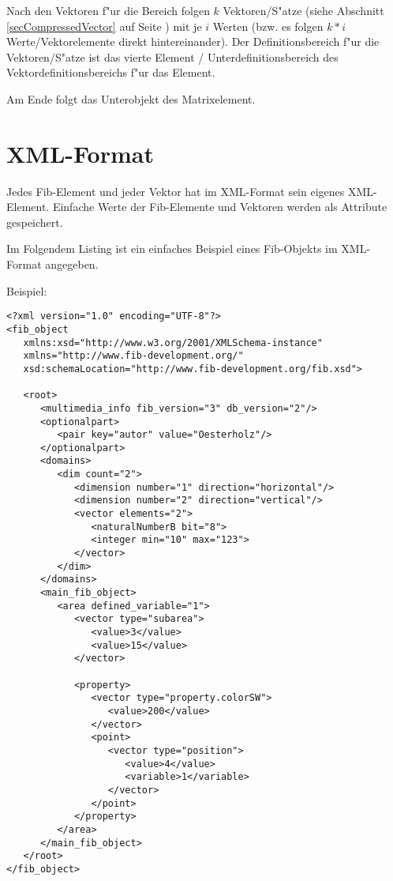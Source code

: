 Nach den Vektoren f"ur die Bereich folgen $k$ Vektoren/S"atze (siehe Abschnitt \ref{secCompressedVector} auf Seite \pageref{secCompressedVector}) mit je $i$ Werten (bzw. es folgen $k * i$ Werte/Vektorelemente direkt hintereinander). Der Definitionsbereich f"ur die Vektoren/S"atze ist das vierte Element / Unterdefinitionsbereich des Vektordefinitionsbereichs f"ur das Element.

Am Ende folgt das Unterobjekt des Matrixelement.






\section{XML-Format}
\label{xmlFormat}

Jedes Fib-Element und jeder Vektor hat im XML-Format sein eigenes XML-Element. Einfache Werte der Fib-Elemente und Vektoren werden als Attribute gespeichert.

Im Folgendem Listing ist ein einfaches Beispiel eines Fib-Objekts im XML-Format angegeben.

\bigskip\noindent
Beispiel:
\begin{verbatim}
<?xml version="1.0" encoding="UTF-8"?>
<fib_object
   xmlns:xsd="http://www.w3.org/2001/XMLSchema-instance"
   xmlns="http://www.fib-development.org/"
   xsd:schemaLocation="http://www.fib-development.org/fib.xsd">

   <root>
      <multimedia_info fib_version="3" db_version="2"/>
      <optionalpart>
         <pair key="autor" value="Oesterholz"/>
      </optionalpart>
      <domains>
         <dim count="2">
            <dimension number="1" direction="horizontal"/>
            <dimension number="2" direction="vertical"/>
            <vector elements="2">
               <naturalNumberB bit="8">
               <integer min="10" max="123">
            </vector>
         </dim>
      </domains>
      <main_fib_object>
         <area defined_variable="1">
            <vector type="subarea">
               <value>3</value>
               <value>15</value>
            </vector>

            <property>
               <vector type="property.colorSW">
                  <value>200</value>
               </vector>
               <point>
                  <vector type="position">
                     <value>4</value>
                     <variable>1</variable>
                  </vector>
               </point>
            </property>
         </area>
      </main_fib_object>
   </root>
</fib_object>
\end{verbatim}


